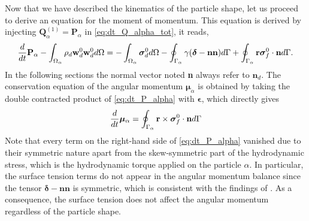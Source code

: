 Now that we have described the kinematics   of the particle shape, let us proceed to derive an equation for the moment of momentum.
This equation is derived by injecting $\textbf{Q}_\alpha^{(1)} = \textbf{P}_\alpha$ in \ref{eq:dt_Q_alpha_tot}, it reads, 
\begin{equation}
    \ddt {\textbf{P}_\alpha}
    - \intO{ \rho_d  \textbf{w}_d^0 \textbf{w}_d^0 }
    = 
    - \intO{\bm{\sigma}_d^0}
    - \intS{ 
        \gamma (\bm\delta - \textbf{nn})
    }
    + \intS{ \textbf{r}\bm{\sigma}_f^0\cdot \textbf{n}}.
    \label{eq:dt_P_alpha}
\end{equation}
In the following sections the normal vector noted \textbf{n} always refer to $\textbf{n}_d$. 
The conservation equation of the angular momentum $\bm{\mu}_\alpha$ is obtained by taking the double contracted product of \ref{eq:dt_P_alpha} with $\bm\epsilon$, which directly gives
\begin{equation}
    \ddt\bm{\mu}_\alpha
    =  
    \intS{ \textbf{r} \times \bm{\sigma}_f^0\cdot \textbf{n} }
    \label{eq:dt_mu_alpha}
\end{equation}
Note that every term on the right-hand side of \ref{eq:dt_P_alpha} vanished due to their symmetric nature apart from the skew-symmetric part of the hydrodynamic stress, which is the hydrodynamic torque applied on the particle $\alpha$.
In particular, the surface tension terms do not appear in the angular momentum balance since the tensor $\bm\delta-\textbf{nn}$ is symmetric, which is consistent with the findings of \citet{hesla1993note}. 
As a consequence, the surface tension does not affect the angular momentum regardless of the particle shape. 

